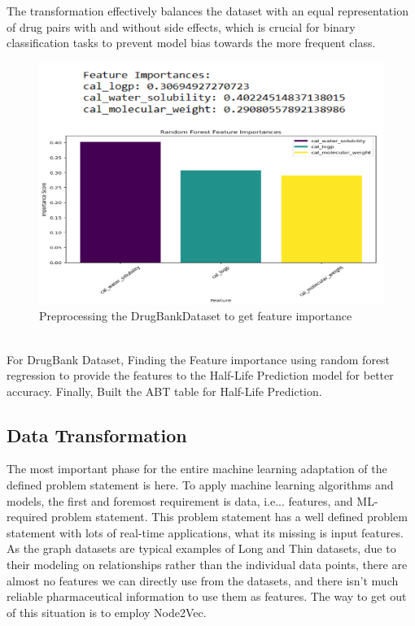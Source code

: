 \documentclass[journal,transmag]{J-NaNA}
\begin{document}
The transformation effectively balances the dataset with an equal representation of drug pairs with and without side effects, which is crucial for binary classification tasks to prevent model bias towards the more frequent class.


\begin{figure}[htbp]
\centering
\includegraphics[width=\linewidth]{Data PreProcess 1 Feature Importance.png} 
\caption{Preprocessing the DrugBankDataset to get feature importance}
\label{fig: chchse-decagon Binary classification dataset} %
\end{figure} 

\\
For DrugBank Dataset, Finding the Feature importance using random forest regression to provide the features to the Half-Life Prediction model for better accuracy. Finally, Built the ABT table for Half-Life Prediction.



\subsection{Data Transformation}
The most important phase for the entire machine learning adaptation of the defined problem statement is here. To apply machine learning algorithms and models, the first and foremost requirement is data, i.e... features, and ML-required problem statement. This problem statement has a well defined problem statement with lots of real-time applications, what its missing is input features. As the graph datasets are typical examples of Long and Thin datasets, due to their modeling on relationships rather than the individual data points, there are almost no features we can directly use from the datasets, and there isn't much reliable pharmaceutical information to use them as features. The way to get out of this situation is to employ Node2Vec. 
\end{document}
